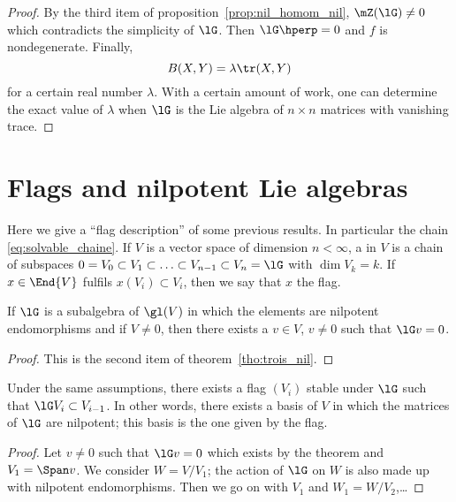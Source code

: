 \begin{proof}
    By the third item of proposition~\ref{prop:nil_homom_nil}, $\mZ(\lG)\neq 0$ which contradicts the simplicity of $\lG$. Then $\lG\hperp=0$ and $f$ is nondegenerate. Finally,
    \begin{equation}
      B(X,Y)=\lambda\tr(X,Y)
    \end{equation}
    for a certain real number $\lambda$. With a certain amount of work, one can determine the exact value of $\lambda$ when $\lG$ is the Lie algebra of $n\times n$ matrices with vanishing trace.
\end{proof}

\section{Flags and nilpotent Lie algebras}

Here we give a ``flag description'' of some previous results. In particular the chain \eqref{eq:solvable_chaine}. If $V$ is a vector space of dimension $n<\infty$, a  in $V$ is a chain of subspaces $0=V_0\subset V_1\subset\ldots\subset V_{n-1}\subset V_n=\lG$ with $\dim V_k=k$. If $x\in\End{V}$ fulfils $x(V_i)\subset V_i$, then we say that $x$  the flag.

\begin{theorem}
If $\lG$ is a subalgebra of $\gl(V)$ in which the elements are nilpotent endomorphisms and if $V\neq 0$, then there exists a $v\in V$, $v\neq 0$ such that $\lG v=0$.
\end{theorem}

\begin{proof}
This is the second item of theorem~\ref{tho:trois_nil}.
\end{proof}

\begin{corollary}
Under the same assumptions, there exists a flag $(V_i)$ stable under $\lG$ such that $\lG V_i\subset V_{i-1}$. In other words, there exists a basis of $V$ in which the matrices of $\lG$ are nilpotent; this basis is the one given by the flag.
\end{corollary}

\begin{proof}
Let $v\neq 0$ such that $\lG v=0$ which exists by the theorem and $V_1=\Span v$. We consider $W=V/V_1$; the action of $\lG$ on $W$ is also made up with nilpotent endomorphisms. Then we go on with $V_1$ and $W_1=W/V_2$,\dots
\end{proof}



